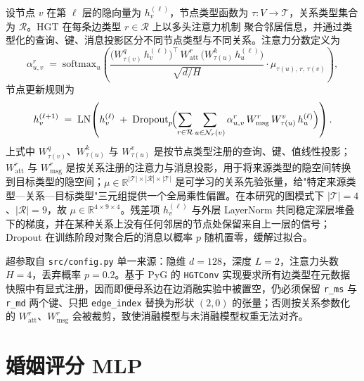 设节点 \(v\) 在第 \(\ell\) 层的隐向量为 \(h_v^{(\ell)}\)，节点类型函数为 \(\tau:V\to\mathcal{T}\)，关系类型集合为 \(\mathcal{R}\)。HGT 在每条边类型 \(r\in\mathcal{R}\) 上以多头注意力机制\citep{vaswani2017attention} 聚合邻居信息，并通过类型化的查询、键、消息投影区分不同节点类型与不同关系\citep{hu2020hgt}。注意力分数定义为
\begin{equation}\label{eq:hgt-att}
  \alpha_{u,v}^{r} \;=\; \mathrm{softmax}_u\!\left(
    \frac{\bigl(W^{q}_{\tau(v)}\,h_v^{(\ell)}\bigr)^{\!\top}\,W^{r}_{\mathrm{att}}\,\bigl(W^{k}_{\tau(u)}\,h_u^{(\ell)}\bigr)}
         {\sqrt{d/H}}
    \cdot \mu_{\tau(u),\,r,\,\tau(v)}\right),
\end{equation}
节点更新规则为
\begin{equation}\label{eq:hgt-upd}
  h_v^{(\ell+1)} \;=\; \mathrm{LN}\!\left(
    h_v^{(\ell)}\;+\;\mathrm{Dropout}_p\!\Bigl(
      \sum_{r\in\mathcal{R}}\sum_{u\in\mathcal{N}_r(v)}
        \alpha_{u,v}^{r}\,W^{r}_{\mathrm{msg}}\,W^{v}_{\tau(u)}\,h_u^{(\ell)}\Bigr)
    \right).
\end{equation}
上式中 \(W^{q}_{\tau(v)}\)、\(W^{k}_{\tau(u)}\) 与 \(W^{v}_{\tau(u)}\) 是按节点类型注册的查询、键、值线性投影；\(W^{r}_{\mathrm{att}}\) 与 \(W^{r}_{\mathrm{msg}}\) 是按关系注册的注意力与消息投影，用于将来源类型的隐空间转换到目标类型的隐空间；\(\mu \in \mathbb{R}^{|\mathcal{T}|\times|\mathcal{R}|\times|\mathcal{T}|}\) 是可学习的关系先验张量，给"特定来源类型—关系—目标类型"三元组提供一个全局乘性偏置。在本研究的图模式下 \(|\mathcal{T}|=4\)、\(|\mathcal{R}|=9\)，故 \(\mu\in\mathbb{R}^{4\times 9\times 4}\)。残差项 \(h_v^{(\ell)}\) 与外层 LayerNorm 共同稳定深层堆叠下的梯度，并在某种关系上没有任何邻居的节点处保留来自上一层的信号；Dropout 在训练阶段对聚合后的消息以概率 \(p\) 随机置零，缓解过拟合\citep{kipf2016gcn}。

超参取自 \texttt{src/config.py} 单一来源：隐维 \(d=128\)，深度 \(L=2\)，注意力头数 \(H=4\)，丢弃概率 \(p=0.2\)。基于 PyG\citep{fey2019pyg} 的 \texttt{HGTConv} 实现要求所有边类型在元数据快照中有显式注册，因而即便母系边在边消融实验中被置空，仍必须保留 \texttt{r\_ms} 与 \texttt{r\_md} 两个键、只把 \texttt{edge\_index} 替换为形状 \((2,0)\) 的张量；否则按关系参数化的 \(W^{r}_{\mathrm{att}}\)、\(W^{r}_{\mathrm{msg}}\) 会被裁剪，致使消融模型与未消融模型权重无法对齐。

\section{婚姻评分 MLP}\label{sec:hgt-scorer}

